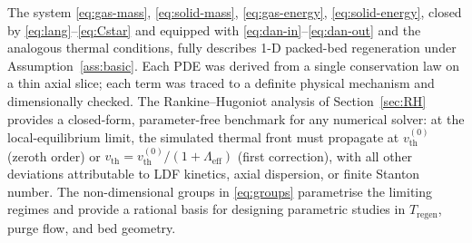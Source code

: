 \documentclass[a4paper,11pt]{amsart}
\theoremstyle{definition}
\begin{document}
The system \eqref{eq:gas-mass}, \eqref{eq:solid-mass}, \eqref{eq:gas-energy}, \eqref{eq:solid-energy}, closed by \eqref{eq:lang}--\eqref{eq:Cstar} and equipped with \eqref{eq:dan-in}--\eqref{eq:dan-out} and the analogous thermal conditions, fully describes 1-D packed-bed regeneration under Assumption~\ref{ass:basic}. Each PDE was derived from a single conservation law on a thin axial slice; each term was traced to a definite physical mechanism and dimensionally checked. The Rankine--Hugoniot analysis of Section~\ref{sec:RH} provides a closed-form, parameter-free benchmark for any numerical solver: at the local-equilibrium limit, the simulated thermal front must propagate at $v_{\text{th}}^{(0)}$ (zeroth order) or $v_{\text{th}}=v_{\text{th}}^{(0)}/(1+\Lambda_{\text{eff}})$ (first correction), with all other deviations attributable to LDF kinetics, axial dispersion, or finite Stanton number. The non-dimensional groups in \eqref{eq:groups} parametrise the limiting regimes and provide a rational basis for designing parametric studies in $T_{\text{regen}}$, purge flow, and bed geometry.
\end{document}
